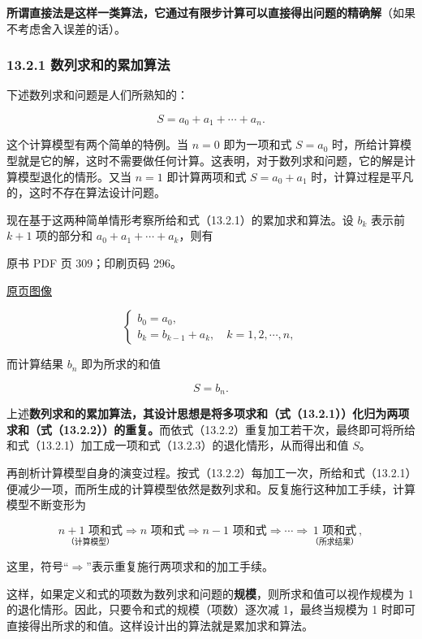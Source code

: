 \textbf{所谓直接法是这样一类算法，它通过有限步计算可以直接得出问题的精确解}（如果不考虑舍入误差的话）。

\subsubsection{13.2.1 数列求和的累加算法}\label{ch13-ux6570ux5217ux6c42ux548cux7684ux7d2fux52a0ux7b97ux6cd5}

下述数列求和问题是人们所熟知的：

\[
S=a_0+a_1+\cdots+a_n.
\tag{13.2.1}
\]

这个计算模型有两个简单的特例。当 \(n=0\) 即为一项和式 \(S=a_0\) 时，所给计算模型就是它的解，这时不需要做任何计算。这表明，对于数列求和问题，它的解是计算模型退化的情形。又当 \(n=1\) 即计算两项和式 \(S=a_0+a_1\) 时，计算过程是平凡的，这时不存在算法设计问题。

现在基于这两种简单情形考察所给和式（13.2.1）的累加求和算法。设 \(b_k\) 表示前 \(k+1\) 项的部分和 \(a_0+a_1+\cdots+a_k\)，则有

\clearpage

原书 PDF 页 309；印刷页码 296。

\href{source-images/pdf-309.jpeg}{原页图像}

\[
\begin{cases}
b_0=a_0,\\
b_k=b_{k-1}+a_k,\quad k=1,2,\cdots,n,
\end{cases}
\tag{13.2.2}
\]

而计算结果 \(b_n\) 即为所求的和值

\[
S=b_n.
\tag{13.2.3}
\]

上述\textbf{数列求和的累加算法，其设计思想是将多项求和（式（13.2.1））化归为两项求和（式（13.2.2））的重复。}而依式（13.2.2）重复加工若干次，最终即可将所给和式（13.2.1）加工成一项和式（13.2.3）的退化情形，从而得出和值 \(S\)。

再剖析计算模型自身的演变过程。按式（13.2.2）每加工一次，所给和式（13.2.1）便减少一项，而所生成的计算模型依然是数列求和。反复施行这种加工手续，计算模型不断变形为

\[
\underset{\text{（计算模型）}}{n+1\text{ 项和式}}
\Rightarrow n\text{ 项和式}
\Rightarrow n-1\text{ 项和式}
\Rightarrow\cdots\Rightarrow
\underset{\text{（所求结果）}}{1\text{ 项和式}},
\]

这里，符号``\(\Rightarrow\)''表示重复施行两项求和的加工手续。

这样，如果定义和式的项数为数列求和问题的\textbf{规模}，则所求和值可以视作规模为 1 的退化情形。因此，只要令和式的规模（项数）逐次减 1，最终当规模为 1 时即可直接得出所求的和值。这样设计出的算法就是累加求和算法。

